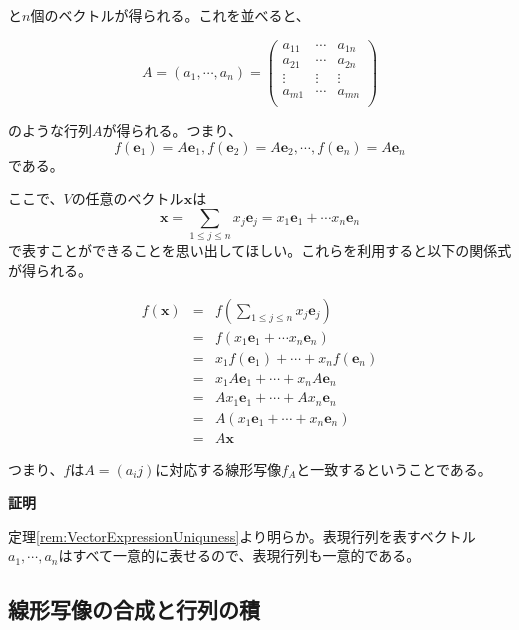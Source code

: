\documentclass[dvipdfmx,autodetect-engine]{jsarticle}
\begin{document}
と$n$個のベクトルが得られる。これを並べると、

$$
A = (a_1, \cdots, a_n) = 
\begin{pmatrix}
a_{11} & \cdots & a_{1n} \\
a_{21} & \cdots & a_{2n} \\
\vdots & \vdots & \vdots \\
a_{m1} & \cdots & a_{mn} \\
\end{pmatrix}
$$

のような行列$A$が得られる。つまり、
$$
f(\bm{e}_1) = A\bm{e}_1, f(\bm{e}_2) = A\bm{e}_2, \cdots, f(\bm{e}_n) = A\bm{e}_n
$$
である。

ここで、$V$の任意のベクトル$\bm{x}$は
$$
\bm{x} = \sum_{1 \leq j \leq n} x_{j}\bm{e}_j = x_1\bm{e}_1 + \cdots x_n\bm{e}_n
$$で表すことができることを思い出してほしい。これらを利用すると以下の関係式が得られる。

\begin{eqnarray*}
f(\bm{x}) &= &f(\sum_{1 \leq j \leq n} x_{j}\bm{e}_j)  \\
&= &f(x_1\bm{e}_1 + \cdots x_n\bm{e}_n) \\
&= &x_1f(\bm{e}_1) + \cdots + x_nf(\bm{e}_n) \\
&= &x_1A\bm{e}_1 + \cdots + x_nA\bm{e}_n \\
&= &Ax_1\bm{e}_1 + \cdots + Ax_n\bm{e}_n \\
&= &A(x_1\bm{e}_1 + \cdots + x_n\bm{e}_n) \\
&= &A\bm{x}
\end{eqnarray*}

つまり、$f$は$A = (a_ij)$に対応する線形写像$f_A$と一致するということである。



{\bf 証明}

定理\ref{rem:VectorExpressionUniquness}より明らか。表現行列を表すベクトル$a_1, \cdots, a_n$はすべて一意的に表せるので、表現行列も一意的である。


\subsection{線形写像の合成と行列の積}
\end{document}
